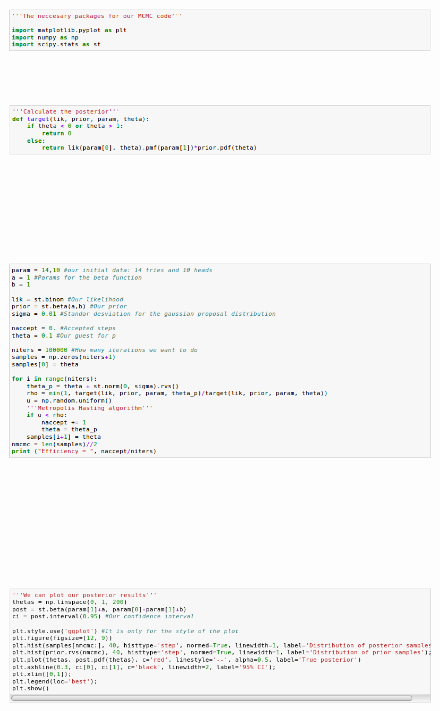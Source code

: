 \documentclass[onecolumn,           %
               showpacs,            %
               preprintnumbers,     %
               aps,                 %
               prl,          	    %
               letterpaper,             %
               superscriptaddress,      %
               nofootinbib,         %
               tightenlines,        %
               floats,floatfix      %
               ,usenatbib,
               ]{revtex4-1}
\begin{document}
\begin{figure}[h!]
\includegraphics[height=2cm]{Figures/c1.png}
\end{figure}
\begin{figure}[h!]
\includegraphics[height=2.339cm]{Figures/c2.png}
\end{figure}
\begin{figure}[h!]
\includegraphics[height=8.85cm]{Figures/c3.png}
\end{figure}
\begin{figure}[h!]
\includegraphics[height=5.21cm]{Figures/c4.png}
\end{figure}
\end{document}
